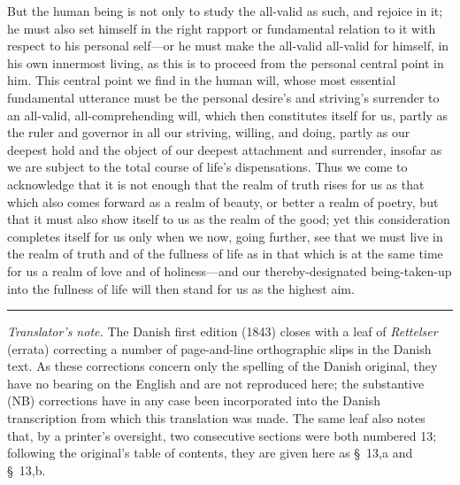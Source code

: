 \documentclass[12pt,a4paper]{book}
\begin{document}
But the human being is not only to study the all-valid as such, and rejoice in it; he
must also set himself in the right rapport or fundamental relation to it with respect to
his personal self---or he must make the all-valid all-valid for himself, in his own
innermost living, as this is to proceed from the personal central point in him. This
central point we find in the human will, whose most essential fundamental utterance must
be the personal desire's and striving's surrender to an all-valid, all-comprehending
will, which then constitutes itself for us, partly as the ruler and governor in all our
striving, willing, and doing, partly as our deepest hold and the object of our deepest
attachment and surrender, insofar as we are subject to the total course of life's
dispensations. Thus we come to acknowledge that it is not enough that the realm of truth
rises for us as that which also comes forward as a realm of beauty, or better a realm of
poetry, but that it must also show itself to us as the realm of the good; yet this
consideration completes itself for us only when we now, going further, see that we must
live in the realm of truth and of the fullness of life as in that which is at the same
time for us a realm of love and of holiness---and our thereby-designated being-taken-up
into the fullness of life will then stand for us as the highest aim.

\begin{center}\rule{0.28\linewidth}{0.4pt}\end{center}

{\footnotesize\noindent\emph{Translator's note.} The Danish first edition (1843)
closes with a leaf of \emph{Rettelser} (errata) correcting a number of
page-and-line orthographic slips in the Danish text. As these corrections concern
only the spelling of the Danish original, they have no bearing on the English and
are not reproduced here; the substantive (NB) corrections have in any case been
incorporated into the Danish transcription from which this translation was made. The
same leaf also notes that, by a printer's oversight, two consecutive sections were
both numbered 13; following the original's table of contents, they are given here as
\S~13,a and \S~13,b.\par}
\end{document}
